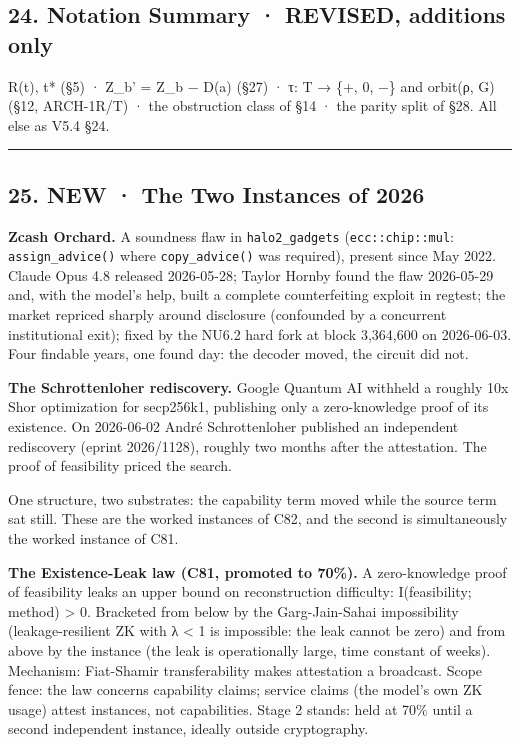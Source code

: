 \documentclass[
]{article}
\begin{document}
\subsection{24. Notation Summary · REVISED, additions
only}\label{notation-summary-revised-additions-only}

R(t), t* (§5) · Z\_b' = Z\_b − D(a) (§27) · τ: T → \{+, 0, −\} and
orbit(ρ, G) (§12, ARCH-1R/T) · the obstruction class of §14 · the parity
split of §28. All else as V5.4 §24.

\begin{center}\rule{0.5\linewidth}{0.5pt}\end{center}

\subsection{25. NEW · The Two Instances of
2026}\label{new-the-two-instances-of-2026}

\textbf{Zcash Orchard.} A soundness flaw in \texttt{halo2\_gadgets}
(\texttt{ecc::chip::mul}: \texttt{assign\_advice()} where
\texttt{copy\_advice()} was required), present since May 2022. Claude
Opus 4.8 released 2026-05-28; Taylor Hornby found the flaw 2026-05-29
and, with the model's help, built a complete counterfeiting exploit in
regtest; the market repriced sharply around disclosure (confounded by a
concurrent institutional exit); fixed by the NU6.2 hard fork at block
3,364,600 on 2026-06-03. Four findable years, one found day: the decoder
moved, the circuit did not.

\textbf{The Schrottenloher rediscovery.} Google Quantum AI withheld a
roughly 10x Shor optimization for secp256k1, publishing only a
zero-knowledge proof of its existence. On 2026-06-02 André
Schrottenloher published an independent rediscovery (eprint 2026/1128),
roughly two months after the attestation. The proof of feasibility
priced the search.

One structure, two substrates: the capability term moved while the
source term sat still. These are the worked instances of C82, and the
second is simultaneously the worked instance of C81.

\textbf{The Existence-Leak law (C81, promoted to 70\%).} A
zero-knowledge proof of feasibility leaks an upper bound on
reconstruction difficulty: I(feasibility; method) \textgreater{} 0.
Bracketed from below by the Garg-Jain-Sahai impossibility
(leakage-resilient ZK with λ \textless{} 1 is impossible: the leak
cannot be zero) and from above by the instance (the leak is
operationally large, time constant of weeks). Mechanism: Fiat-Shamir
transferability makes attestation a broadcast. Scope fence: the law
concerns capability claims; service claims (the model's own ZK usage)
attest instances, not capabilities. Stage 2 stands: held at 70\% until a
second independent instance, ideally outside cryptography.
\end{document}
